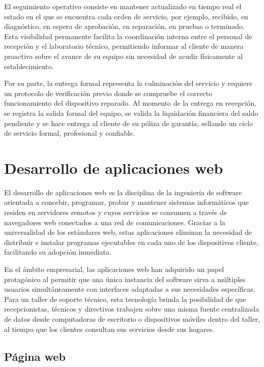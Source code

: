 El seguimiento operativo consiste en mantener actualizado en tiempo real el estado en el que se encuentra cada orden de servicio, por ejemplo, recibido, en diagnóstico, en espera de aprobación, en reparación, en pruebas o terminado. Esta visibilidad permanente facilita la coordinación interna entre el personal de recepción y el laboratorio técnico, permitiendo informar al cliente de manera proactiva sobre el avance de su equipo sin necesidad de acudir físicamente al establecimiento.

Por su parte, la entrega formal representa la culminación del servicio y requiere un protocolo de verificación previo donde se compruebe el correcto funcionamiento del dispositivo reparado. Al momento de la entrega en recepción, se registra la salida formal del equipo, se valida la liquidación financiera del saldo pendiente y se hace entrega al cliente de su póliza de garantía, sellando un ciclo de servicio formal, profesional y confiable.

\section{Desarrollo de aplicaciones web}

El desarrollo de aplicaciones web es la disciplina de la ingeniería de software orientada a concebir, programar, probar y mantener sistemas informáticos que residen en servidores remotos y cuyos servicios se consumen a través de navegadores web conectados a una red de comunicaciones. Gracias a la universalidad de los estándares web, estas aplicaciones eliminan la necesidad de distribuir e instalar programas ejecutables en cada uno de los dispositivos cliente, facilitando su adopción inmediata.

En el ámbito empresarial, las aplicaciones web han adquirido un papel protagónico al permitir que una única instancia del software sirva a múltiples usuarios simultáneamente con interfaces adaptadas a sus necesidades específicas. Para un taller de soporte técnico, esta tecnología brinda la posibilidad de que recepcionistas, técnicos y directivos trabajen sobre una misma fuente centralizada de datos desde computadoras de escritorio o dispositivos móviles dentro del taller, al tiempo que los clientes consultan sus servicios desde sus hogares.

\subsection{Página web}

